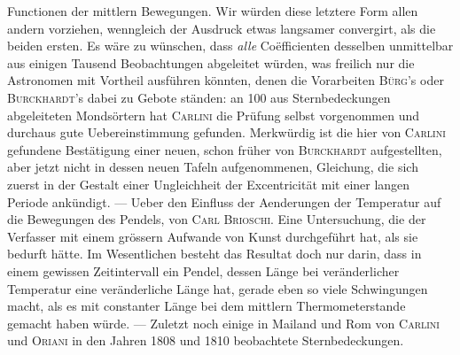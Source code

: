 Functionen der mittlern Bewegungen. Wir würden diese letztere Form allen andern vorziehen, wenngleich der Ausdruck etwas langsamer convergirt, als die beiden ersten. Es wäre zu wünschen, dass \emph{alle} Coëfficienten desselben unmittelbar aus einigen Tausend Beobachtungen abgeleitet würden, was freilich nur die Astronomen mit Vortheil ausführen könnten, denen die Vorarbeiten \textsc{Bürg}'s oder \textsc{Burckhardt}'s dabei zu Gebote ständen: an 100 aus Sternbedeckungen abgeleiteten Mondsörtern hat \textsc{Carlini} die Prüfung selbst vorgenommen und durchaus gute Uebereinstimmung gefunden. Merkwürdig ist die hier von \textsc{Carlini} gefundene Bestätigung einer neuen, schon früher von \textsc{Burckhardt} aufgestellten, aber jetzt nicht in dessen neuen Tafeln aufgenommenen, Gleichung, die sich zuerst in der Gestalt einer Ungleichheit der Excentricität mit einer langen Periode ankündigt. --- Ueber den Einfluss der Aenderungen der Temperatur auf die Bewegungen des Pendels, von \textsc{Carl Brioschi}. Eine Untersuchung, die der Verfasser mit einem grössern Aufwande von Kunst durchgeführt hat, als sie bedurft hätte. Im Wesentlichen besteht das Resultat doch nur darin, dass in einem gewissen Zeitintervall ein Pendel, dessen Länge bei veränderlicher Temperatur eine veränderliche Länge hat, gerade eben so viele Schwingungen macht, als es mit constanter Länge bei dem mittlern Thermometerstande gemacht haben würde. --- Zuletzt noch einige in Mailand und Rom von \textsc{Carlini} und \textsc{Oriani} in den Jahren 1808 und 1810 beobachtete Sternbedeckungen.

